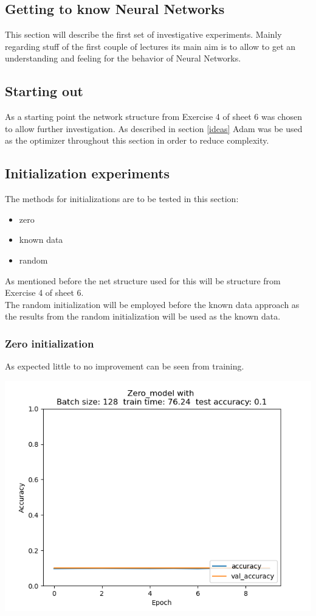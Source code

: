 \documentclass{article}
\newenvironment{Figure}
{\par\medskip\noindent\minipage{\linewidth}}
{\endminipage\par\medskip}
\begin{document}
\begin{multicols}{2}
\section{Getting to know Neural Networks}
This section will describe the first set of investigative experiments. Mainly regarding stuff of the first couple of lectures its main aim is to allow to get an understanding and feeling for the behavior of Neural Networks.

\subsection{Starting out}
As a starting point the network structure from Exercise 4 of sheet 6 was chosen to allow further investigation. As described in section \ref{ideas} Adam was be used as the optimizer throughout this section in order to reduce complexity.

\subsection{Initialization experiments}
The methods for initializations are to be tested in this section:
\begin{itemize}
	\item zero
	\item known data
	\item random
\end{itemize}
As mentioned before the net structure used for this will be structure from Exercise 4 of sheet 6.\\
The random initialization will be employed before the known data approach as the results from the random initialization will be used as the known data.
\subsubsection{Zero initialization}
As expected little to no improvement can be seen from training.
\begin{Figure}
	\label{fig:zero_init}
	\centering
	\includegraphics[width=\linewidth]{../img_1_1_init/acc_plot_Zero_model}
\end{Figure}



\end{multicols}
\end{document}
